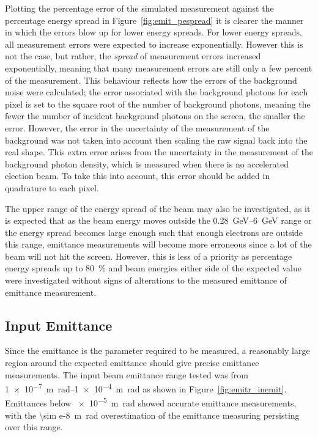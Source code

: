 Plotting the percentage error of the simulated measurement against the
percentage energy spread in Figure~\ref{fig:emit_pespread} it is clearer the
manner in which the errors blow up for lower energy spreads. 
For lower energy spreads, all measurement errors were expected to increase
exponentially.  However this is not the case, but rather, the \emph{spread} of
measurement errors increased exponentially, meaning that many measurement errors
are still only a few percent of the measurement. This behaviour reflects how the
errors of the background noise were calculated; the error associated with the
background photons for each pixel is set to the square root of the number of
background photons, meaning the fewer the number of incident background photons
on the screen, the smaller the error. However, the error in the uncertainty of
the measurement of the background was not taken into account then scaling the
raw signal back into the real shape. This extra error arises from the
uncertainty in the measurement of the background photon density, which is
measured when there is no accelerated election beam. To take this into
account, this error should be added in quadrature to each pixel.

The upper range of the energy spread of the beam may also be investigated, as it
is expected that as the beam energy moves outside the
\SIrange{0.28}{6}{\giga\electronvolt} range or the energy spread becomes large
enough such that enough electrons are outside this range, emittance measurements
will become more erroneous since a lot of the beam will not hit the screen.
However, this is less of a priority as percentage energy spreads up to
\SI{80}{\percent} and beam energies either side of the expected value were
investigated without signs of alterations to the measured emittance of emittance
measurement.


\subsection{Input Emittance}



Since the emittance is the parameter required to be measured, a reasonably large
region around the expected emittance should give precise emittance measurements.
The input beam emittance range tested was from \SIrange{1e-7}{1e-4}%
{\meter\radian} as shown in Figure~\ref{fig:emitr_inemit}. Emittances below
\SI{e-5}{\meter\radian} showed accurate emittance measurements, with the
\SI{\sim e-8}{\meter\radian} overestimation of the emittance measuring
persisting over this range.


